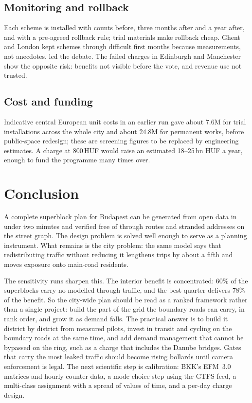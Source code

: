 \documentclass[11pt,a4paper]{article}
\begin{document}
\subsection{Monitoring and rollback}
Each scheme is installed with counts before, three months after and a year after, and with a pre-agreed rollback rule; trial materials make rollback cheap. Ghent and London kept schemes through difficult first months because measurements, not anecdotes, led the debate. The failed charges in Edinburgh and Manchester show the opposite risk: benefits not visible before the vote, and revenue use not trusted.

\subsection{Cost and funding}
Indicative central European unit costs in an earlier run gave about \texteuro7.6M for trial installations across the whole city and about \texteuro24.8M for permanent works, before public-space redesign; these are screening figures to be replaced by engineering estimates. A charge at 800\,HUF would raise an estimated 18--25\,bn HUF a year, enough to fund the programme many times over.

\section{Conclusion}

A complete superblock plan for Budapest can be generated from open data in under two minutes and verified free of through routes and stranded addresses on the street graph. The design problem is solved well enough to serve as a planning instrument. What remains is the city problem: the same model says that redistributing traffic without reducing it lengthens trips by about a fifth and moves exposure onto main-road residents.

The sensitivity runs sharpen this. The interior benefit is concentrated: 60\% of the superblocks carry no modelled through traffic, and the best quarter delivers 78\% of the benefit. So the city-wide plan should be read as a ranked framework rather than a single project: build the part of the grid the boundary roads can carry, in rank order, and grow it as demand falls. The practical answer is to build it district by district from measured pilots, invest in transit and cycling on the boundary roads at the same time, and add demand management that cannot be bypassed on the ring, such as a charge that includes the Danube bridges. Gates that carry the most leaked traffic should become rising bollards until camera enforcement is legal. The next scientific step is calibration: BKK's EFM~3.0 matrices and hourly counter data, a mode-choice step using the GTFS feed, a multi-class assignment with a spread of values of time, and a per-day charge design.
\end{document}
